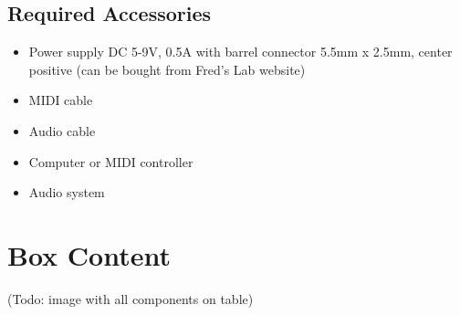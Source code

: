 \documentclass{scrartcl}
\begin{document}
\subsection{Required Accessories}

\begin{itemize}
    \item Power supply DC 5-9V, 0.5A with barrel connector 5.5mm x 2.5mm, center positive (can be bought from Fred's Lab website)
    \item MIDI cable
    \item Audio cable
    \item Computer or MIDI controller
    \item Audio system
\end{itemize}


\section{Box Content}

 (Todo: image with all components on table)

\vspace{0.25cm}
\end{document}

